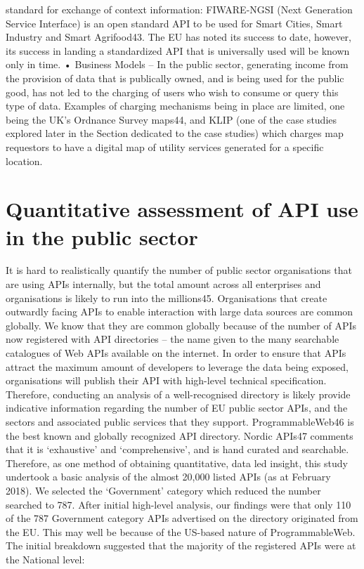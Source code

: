 standard for exchange of context information: FIWARE-NGSI (Next Generation Service Interface) is an
open standard API to be used for Smart Cities, Smart Industry and Smart Agrifood43. The EU has noted its
success to date, however, its success in landing a standardized API that is universally used will be known
only in time.
• Business Models – In the public sector, generating income from the provision of data that is
publically owned, and is being used for the public good, has not led to the charging of users who
wish to consume or query this type of data. Examples of charging mechanisms being in place are
limited, one being the UK’s Ordnance Survey maps44, and KLIP (one of the case studies explored
later in the Section dedicated to the case studies) which charges map requestors to have a digital
map of utility services generated for a specific location. 

\section{Quantitative assessment of API use in the public sector}

It is hard to realistically quantify the number of public sector organisations that are using APIs internally, but
the total amount across all enterprises and organisations is likely to run into the millions45.
Organisations that create outwardly facing APIs to enable interaction with large data sources are common
globally. We know that they are common globally because of the number of APIs now registered with API
directories – the name given to the many searchable catalogues of Web APIs available on the internet. In
order to ensure that APIs attract the maximum amount of developers to leverage the data being exposed,
organisations will publish their API with high-level technical specification. Therefore, conducting an analysis
of a well-recognised directory is likely provide indicative information regarding the number of EU public
sector APIs, and the sectors and associated public services that they support.
ProgrammableWeb46 is the best known and globally recognized API directory. Nordic APIs47 comments that
it is ‘exhaustive’ and ‘comprehensive’, and is hand curated and searchable. Therefore, as one method of
obtaining quantitative, data led insight, this study undertook a basic analysis of the almost 20,000 listed
APIs (as at February 2018).
We selected the ‘Government’ category which reduced the number searched to 787. After initial high-level
analysis, our findings were that only 110 of the 787 Government category APIs advertised on the directory
originated from the EU. This may well be because of the US-based nature of ProgrammableWeb. The initial
breakdown suggested that the majority of the registered APIs were at the National level:


